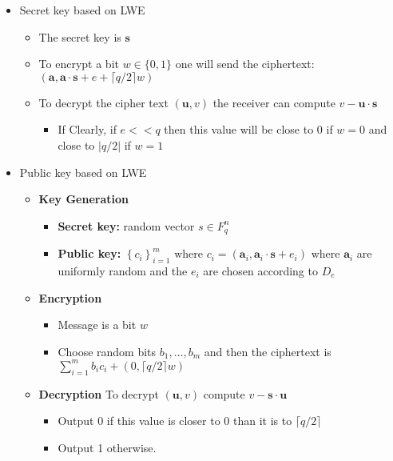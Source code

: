 \begin{itemize}
  \item Secret key based on LWE
  \begin{itemize}
  	\item The secret key is $\mathbf{s}$
  	\item To encrypt a bit $w \in \{0,1\}$ one will send the ciphertext: $(\mathbf{a}, \mathbf{a} \cdot \mathbf{s}+e+\lceil q / 2\rceil w)$
  	\item To decrypt the cipher text $(\mathbf{u},v)$ the receiver can compute $v-\mathbf{u} \cdot \mathbf{s}$
    \begin{itemize}
  		\item If Clearly, if $e<<q$ then this value will be close to 0 if $w=0$ and close to $|q / 2|$ if $w=1$
    \end{itemize}
  \end{itemize}

  \item Public key based on LWE
  \begin{itemize}
  	\item \textbf{Key Generation}
    \begin{itemize}
    	\item \textbf{Secret key:} random vector $s \in F_{q}^{n}$ 
      \item \textbf{Public key:} $\left\{c_{i}\right\}_{i=1}^{m}$ where $c_{i}=\left(\mathbf{a}_{i}, \mathbf{a}_{i} \cdot \mathbf{s}+e_{i}\right)$ where $\mathbf{a}_{i}$ are uniformly random and the $e_{i}$ are chosen according to $D_{e}$
    \end{itemize}
  	\item \textbf{Encryption}
    \begin{itemize}
    	\item Message is a bit $w$
      \item Choose random bits $b_{1}, \ldots, b_{m}$ and then the ciphertext is $\sum_{i=1}^{m} b_{i} c_{i}+(0,\lceil q / 2\rceil w)$
    \end{itemize}
  	\item \textbf{Decryption} To decrypt $(\mathbf{u}, v)$ compute $v-\mathbf{s} \cdot \mathbf{u}$
    \begin{itemize}
    	\item Output 0 if this value is closer to 0 than it is to $\lceil q / 2\rceil$
      \item Output 1 otherwise.
    \end{itemize}
  \end{itemize}


\end{itemize}
